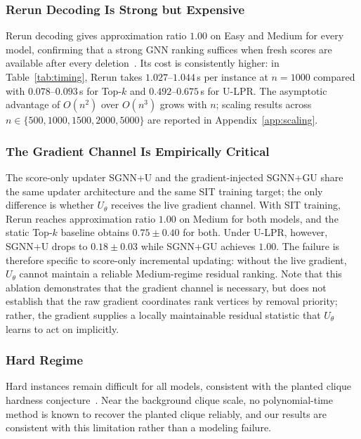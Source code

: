 \documentclass[mathematics,article,submit,pdftex,moreauthors]{Definitions/mdpi}
\begin{document}
\subsubsection{Rerun Decoding Is Strong but Expensive}

Rerun decoding gives approximation ratio $1.00$ on Easy and Medium for every
model, confirming that a strong GNN ranking suffices when fresh scores are available
after every deletion~\citep{ShohamHRV26}. Its cost is consistently higher: in
Table~\ref{tab:timing}, Rerun takes $1.027$--$1.044$\,s per instance at $n=1000$
compared with $0.078$--$0.093$\,s for Top-$k$ and $0.492$--$0.675$\,s for U-LPR. The
asymptotic advantage of $O(n^2)$ over $O(n^3)$ grows with $n$; scaling results
across $n\in\{500,1000,1500,2000,5000\}$ are reported in
Appendix~\ref{app:scaling}.

\subsubsection{The Gradient Channel Is Empirically Critical}

The score-only updater \textsc{SGNN+U} and the gradient-injected \textsc{SGNN+GU}
share the same updater architecture and the same SIT training target; the only
difference is whether $U_\theta$ receives the live gradient channel. With SIT
training, Rerun reaches approximation ratio $1.00$ on Medium for both models, and
the static Top-$k$ baseline obtains $0.75{\pm}0.40$ for both. Under U-LPR,
however, \textsc{SGNN+U} drops to $0.18{\pm}0.03$ while \textsc{SGNN+GU} achieves
$1.00$. The failure is therefore specific to score-only incremental updating:
without the live gradient, $U_\theta$ cannot maintain a reliable Medium-regime
residual ranking. Note that this ablation demonstrates that the gradient channel is
necessary, but does not establish that the raw gradient coordinates rank vertices by
removal priority; rather, the gradient supplies a locally maintainable residual
statistic that $U_\theta$ learns to act on implicitly.

\subsubsection{Hard Regime}

Hard instances remain difficult for all models, consistent with the planted clique
hardness conjecture~\citep{manurangsi2021}. Near the background clique scale, no
polynomial-time method is known to recover the planted clique reliably, and our
results are consistent with this limitation rather than a modeling failure.
\end{document}
